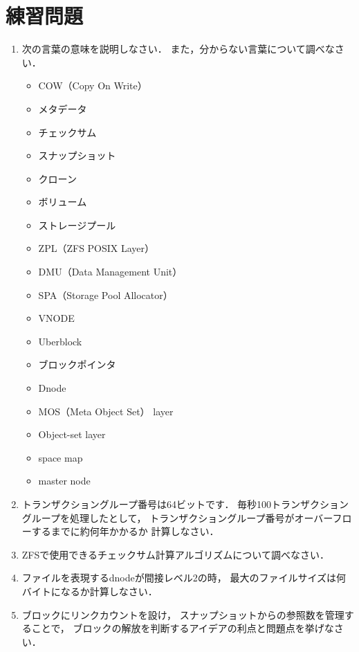 \newpage
\section*{練習問題}
\begin{enumerate}
\item 次の言葉の意味を説明しなさい．
  また，分からない言葉について調べなさい．
  \begin{itemize}
  \item COW（Copy On Write）
  \item メタデータ
  \item チェックサム
  \item スナップショット
  \item クローン
  \item ボリューム
  \item ストレージプール
  \item ZPL（ZFS POSIX Layer）
  \item DMU（Data Management Unit）
  \item SPA（Storage Pool Allocator）
  \item VNODE
  \item Uberblock
  \item ブロックポインタ
  \item Dnode
  \item MOS（Meta Object Set） layer
  \item Object-set layer
  \item space map
  \item master node
  \end{itemize}
  \item トランザクショングループ番号は64ビットです．
    毎秒100トランザクショングループを処理したとして，
    トランザクショングループ番号がオーバーフローするまでに約何年かかるか
    計算しなさい．
  \item ZFSで使用できるチェックサム計算アルゴリズムについて調べなさい．
  \item ファイルを表現するdnodeが間接レベル2の時，
    最大のファイルサイズは何バイトになるか計算しなさい．
  \item ブロックにリンクカウントを設け，
    スナップショットからの参照数を管理することで，
    ブロックの解放を判断するアイデアの利点と問題点を挙げなさい．
\end{enumerate}
